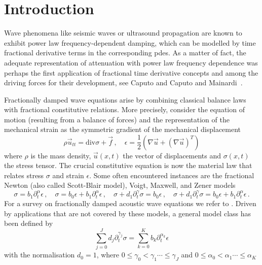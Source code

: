 \section{Introduction}

Wave phenomena like seismic waves or ultrasound propagation are known to exhibit power law frequency-dependent damping,
which can be modelled by time fractional derivative terms in the corresponding {\sc pde}s.
As a matter of fact, the adequate representation of attenuation with power law 
frequency dependence was perhaps the first application of fractional time 
derivative concepts and among the driving forces for their development, 
see Caputo \cite{Caputo:1967} and Caputo and Mainardi~\cite{CaputoMainardi:1971a}.
 
Fractionally damped wave equations arise by combining classical balance laws
with fractional constitutive relations.
More precisely, consider the equation of motion (resulting from a balance of forces) and the representation of the mechanical strain as the symmetric gradient of the mechanical displacement 
\begin{equation}\label{eqn:motion-strain}
\rho\vec{u}_{tt}=\mbox{div}\sigma+\vec{f}\,, \quad \epsilon=\frac12(\nabla\vec{u}+(\nabla\vec{u})^T)
\end{equation}
where $\rho$ is the mass density, $\vec{u}(x,t)$ the vector of displacements and $\sigma(x,t)$ the stress tensor. The crucial constitutive equation is now the material law that relates stress $\sigma$ and strain $\epsilon$.
Some often encountered instances are 
the fractional Newton (also called Scott-Blair model), Voigt, Maxwell, and Zener models
\begin{equation*}
\sigma = b_1 \partial_t^{\alpha} \epsilon\,, \quad
\sigma = b_0 \epsilon + b_1 \partial_t^{\alpha}\epsilon\,, \quad 
\sigma + d_1\partial_t^{\gamma}\sigma = b_0 \epsilon\,, \quad
\sigma + d_1\partial_t^{\gamma}\sigma = b_0 \epsilon + b_1 \partial_t^{\alpha}\epsilon\,.
\end{equation*}
For a survey on fractionally damped acoustic wave equations we refer to \cite{CaiChenFangHolm_survey2018}.
Driven by applications that are not covered by these models, a general model class has been defined by 
\begin{equation}\label{eqn:sumfrac}
\sum_{j=0}^J d_j \partial_t^{\gamma_j} \sigma = \sum_{k=0}^K b_k \partial_t^{\alpha_k} \epsilon
\end{equation}
with the normalisation $d_0=1$, where $0\leq\gamma_0<\gamma_1\cdots\leq \gamma_J$ and $0\leq\alpha_0<\alpha_1\cdots\leq \alpha_K$
